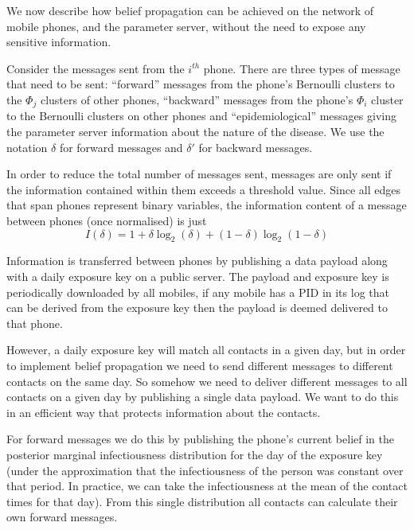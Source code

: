 \documentclass{article}
\begin{document}
We now describe how belief propagation can be achieved on the network of mobile phones, and the parameter server, without the need to expose any sensitive information.

Consider the messages sent from the $i^{th}$ phone. There are three types of message that need to be sent: ``forward'' messages from the phone's Bernoulli clusters to the $\Phi_j$ clusters of other phones, ``backward'' messages from the phone's $\Phi_i$ cluster to the Bernoulli clusters on other phones and ``epidemiological'' messages giving the parameter server information about the nature of the disease. We use the notation $\delta$ for forward messages and $\delta'$ for backward messages.

In order to reduce the total number of messages sent, messages are only sent if the information contained within them exceeds a threshold value. Since all edges that span phones represent binary variables, the information content of a message between phones (once normalised) is just
\[
I(\delta) = 1 + \delta\log_2(\delta) + (1-\delta)\log_2(1-\delta)
\]

Information is transferred between phones by publishing a data payload along with a daily exposure key on a public server. The payload and exposure key is periodically downloaded by all mobiles, if any mobile has a PID in its log that can be derived from the exposure key then the payload is deemed delivered to that phone.

However, a daily exposure key will match all contacts in a given day, but in order to implement belief propagation we need to send different messages to different contacts on the same day. So somehow we need to deliver different messages to all contacts on a given day by publishing a single data payload. We want to do this in an efficient way that protects information about the contacts.

For forward messages we do this by publishing the phone's current belief in the posterior marginal infectiousness distribution for the day of the exposure key (under the approximation that the infectiousness of the person was constant over that period. In practice, we can take the infectiousness at the mean of the contact times for that day). From this single distribution all contacts can calculate their own forward messages.
\end{document}
